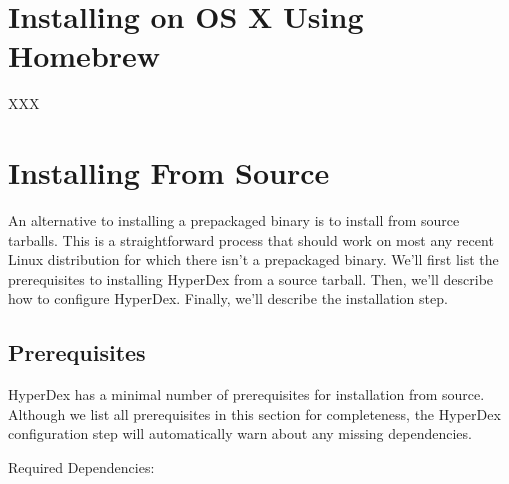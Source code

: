 \inputminted[frame=lines,framesep=2mm,firstline=3]{bash}{\topdir/install/linux-amd64.sh}

\section{Installing on OS X Using Homebrew}
\label{sec:installation:os-x-homebrew}

XXX

\section{Installing From Source}
\label{sec:installation:source}


An alternative to installing a prepackaged binary is to install from source
tarballs.  This is a straightforward process that should work on most any recent
Linux distribution for which there isn't a prepackaged binary.  We'll first list
the prerequisites to installing HyperDex from a source tarball.  Then, we'll
describe how to configure HyperDex.  Finally, we'll describe the installation
step.

\subsection{Prerequisites}
\label{sec:installation:source:deps}

HyperDex has a minimal number of prerequisites for installation from source.
Although we list all prerequisites in this section for completeness, the
HyperDex configuration step will automatically warn about any missing
dependencies.

Required Dependencies:


